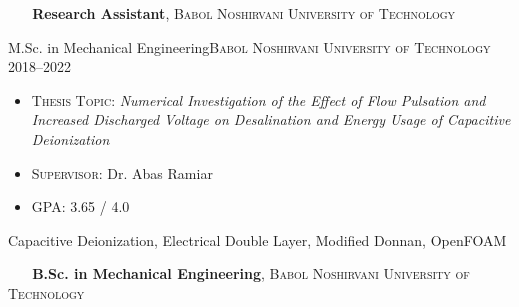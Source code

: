 
\vspace{1pt}
\begin{scholarship}
  {\textbf{\ \ \ \textbf{Research Assistant}}, {\textsc{Babol Noshirvani University of Technology}}}
\end{scholarship}

\vspace{-3pt}

\begin{experiences}
  \experience
  {}   {M.Sc. in Mechanical Engineering}{\normalfont\textsc{Babol Noshirvani University of Technology}}{}
  {2018--2022\ \ \ \ } {
    \begin{itemize}
      \item \textsc{Thesis Topic}: {\emph{Numerical Investigation of the Effect of Flow Pulsation and Increased Discharged Voltage on Desalination and Energy Usage of Capacitive Deionization}}
      \item \textsc{Supervisor}: {Dr. Abas Ramiar}
      \item \textsc{GPA}: 3.65 / 4.0
        \vspace{3pt}
    \end{itemize}
  }
  {Capacitive Deionization, Electrical Double Layer, Modified Donnan, OpenFOAM}
\end{experiences}
\vspace{-20pt}
\begin{scholarship}
  {\textbf{\ \ \ \textbf{B.Sc. in Mechanical Engineering}}, \textsc{Babol Noshirvani University of Technology}}
\end{scholarship}
\vspace{2pt}
